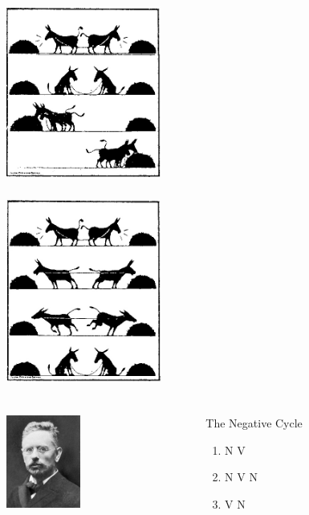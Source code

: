 \documentclass[compress]{beamer}
\begin{document}
\begin{frame}
\frametitle{\cite{grice:1975}}
\begin{center}
     \includegraphics[width=2in]{cooperation-grice.png}
\end{center}
\end{frame}

\begin{frame}
\frametitle{\cite{grice:1975}}
\begin{center}
     \includegraphics[width=2in]{cooperation.png}
\end{center}
\end{frame}


\begin{frame}
\frametitle{\cite{jespersen:1917}}
\begin{columns}[T]  
   \begin{column}{.25\textwidth}
	  \includegraphics[height=1.2in]{jespersen.jpg}   
   \end{column}
   \begin{column}{.7\textwidth}
      \begin{block}{The Negative Cycle}
	\begin{enumerate}
	     \item N V
	     \item N V N
	     \item V N
	\end{enumerate}
      \end{block}
    \end{column}
  \end{columns}
\end{frame}
\end{document}
